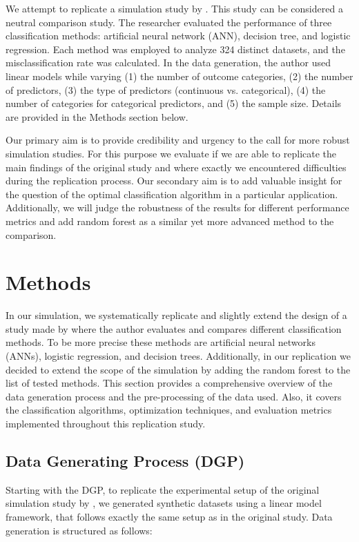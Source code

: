 \documentclass[12pt]{article}
\begin{document}
We attempt to replicate a simulation study by \textcite{kim:10}. This study can be considered a neutral comparison study. The researcher evaluated the performance of three classification methods: artificial neural network (ANN), decision tree, and logistic regression. Each method was employed to analyze 324 distinct datasets, and the misclassification rate was calculated. In the data generation, the author used linear models while varying (1) the number of outcome categories, (2) the number of predictors, (3) the type of predictors (continuous vs. categorical), (4) the number of categories for categorical predictors, and (5) the sample size. Details are provided in the Methods section below.

Our primary aim is to provide credibility and urgency to the call for more robust simulation studies. For this purpose we evaluate if we are able to replicate the main findings of the original study and where exactly we encountered difficulties during the replication process. Our secondary aim is to add valuable insight for the question of the optimal classification algorithm in a particular application. Additionally, we will judge the robustness of the results for different performance metrics and add random forest as a similar yet more advanced method to the comparison.


\section{Methods}

In our simulation, we systematically replicate and slightly extend the design of a study made by \textcite{kim:10} where the author evaluates and compares different classification methods. To be more precise these methods are artificial neural networks (ANNs), logistic regression, and decision trees. Additionally, in our replication we decided to extend the scope of the simulation by adding the random forest to the list of tested methods.  This section provides a comprehensive overview of the data generation process and the pre-processing of the data used. Also, it covers the classification algorithms, optimization techniques, and evaluation metrics implemented throughout this replication study.

\subsection{Data Generating Process (DGP)}

Starting with the DGP, to replicate the experimental setup of the original simulation study by \textcite{kim:10}, we generated synthetic datasets using a linear model framework, that follows exactly the same setup as in the original study. Data generation is structured as follows:
\end{document}
